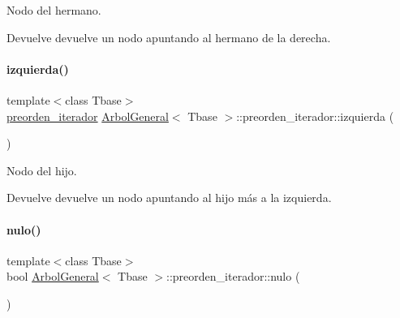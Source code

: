 Nodo del hermano. 

\begin{DoxyReturn}{Devuelve}
devuelve un nodo apuntando al hermano de la derecha. 
\end{DoxyReturn}
\hypertarget{classArbolGeneral_1_1preorden__iterador_adb5df08e17d808c2cc730d8652265422}{}\label{classArbolGeneral_1_1preorden__iterador_adb5df08e17d808c2cc730d8652265422} 
\paragraph{\texorpdfstring{izquierda()}{izquierda()}}
{\footnotesize\ttfamily template$<$class Tbase$>$ \\
\hyperlink{classArbolGeneral_1_1preorden__iterador}{preorden\+\_\+iterador} \hyperlink{classArbolGeneral}{Arbol\+General}$<$ Tbase $>$\+::preorden\+\_\+iterador\+::izquierda (\begin{DoxyParamCaption}{ }\end{DoxyParamCaption})\hspace{0.3cm}{\ttfamily [inline]}}



Nodo del hijo. 

\begin{DoxyReturn}{Devuelve}
devuelve un nodo apuntando al hijo más a la izquierda. 
\end{DoxyReturn}
\hypertarget{classArbolGeneral_1_1preorden__iterador_a41286b60f0285afb9852679acb42c0b6}{}\label{classArbolGeneral_1_1preorden__iterador_a41286b60f0285afb9852679acb42c0b6} 
\paragraph{\texorpdfstring{nulo()}{nulo()}}
{\footnotesize\ttfamily template$<$class Tbase$>$ \\
bool \hyperlink{classArbolGeneral}{Arbol\+General}$<$ Tbase $>$\+::preorden\+\_\+iterador\+::nulo (\begin{DoxyParamCaption}{ }\end{DoxyParamCaption})\hspace{0.3cm}{\ttfamily [inline]}}



